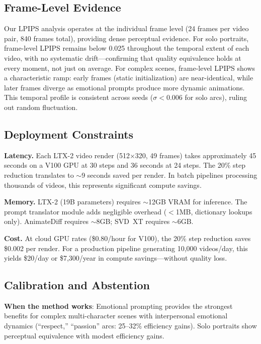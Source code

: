 \documentclass[10pt,twocolumn,letterpaper]{article}
\begin{document}
\subsection{Frame-Level Evidence}

Our LPIPS analysis operates at the individual frame level (24 frames per video pair, 840 frames total), providing dense perceptual evidence. For solo portraits, frame-level LPIPS remains below 0.025 throughout the temporal extent of each video, with no systematic drift---confirming that quality equivalence holds at every moment, not just on average. For complex scenes, frame-level LPIPS shows a characteristic ramp: early frames (static initialization) are near-identical, while later frames diverge as emotional prompts produce more dynamic animations. This temporal profile is consistent across seeds ($\sigma < 0.006$ for solo arcs), ruling out random fluctuation.

\subsection{Deployment Constraints}

\textbf{Latency.} Each LTX-2 video render (512$\times$320, 49 frames) takes approximately 45 seconds on a V100 GPU at 30 steps and 36 seconds at 24 steps. The 20\% step reduction translates to $\sim$9 seconds saved per render. In batch pipelines processing thousands of videos, this represents significant compute savings.

\textbf{Memory.} LTX-2 (19B parameters) requires $\sim$12GB VRAM for inference. The prompt translator module adds negligible overhead ($<$1MB, dictionary lookups only). AnimateDiff requires $\sim$8GB; SVD~XT requires $\sim$6GB.

\textbf{Cost.} At cloud GPU rates (\$0.80/hour for V100), the 20\% step reduction saves \$0.002 per render. For a production pipeline generating 10,000 videos/day, this yields \$20/day or \$7,300/year in compute savings---without quality loss.

\subsection{Calibration and Abstention}

\textbf{When the method works}: Emotional prompting provides the strongest benefits for complex multi-character scenes with interpersonal emotional dynamics (``respect,'' ``passion'' arcs: 25--32\% efficiency gains). Solo portraits show perceptual equivalence with modest efficiency gains.
\end{document}
